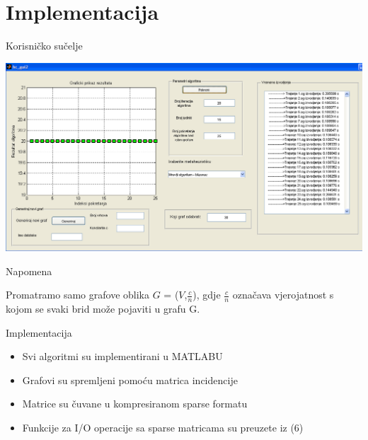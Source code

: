 \documentclass{beamer}
\begin{document}
\section{Implementacija}
\begin{frame}{Korisni\v{c}ko su\v{c}elje}
\begin{center}
\includegraphics[scale = 0.28]{gui.png}
\end{center}
\end{frame}

\begin{frame}{Napomena}

Promatramo samo grafove oblika $G$ = ($V$,$\frac{c} {n}$), gdje $\frac{c} {n}$ ozna\v{c}ava vjerojatnost s kojom se svaki brid mo\v{z}e pojaviti u grafu G. 

\end{frame}
\begin{frame}{Implementacija}
\begin{itemize}
\item Svi algoritmi su implementirani u MATLABU\\
\item Grafovi su spremljeni pomoću matrica incidencije\\
\item Matrice su čuvane u kompresiranom sparse formatu\\
\item Funkcije za I/O operacije sa sparse matricama su preuzete iz (6)\\ 
\end{itemize}
\end{frame}
\end{document}
